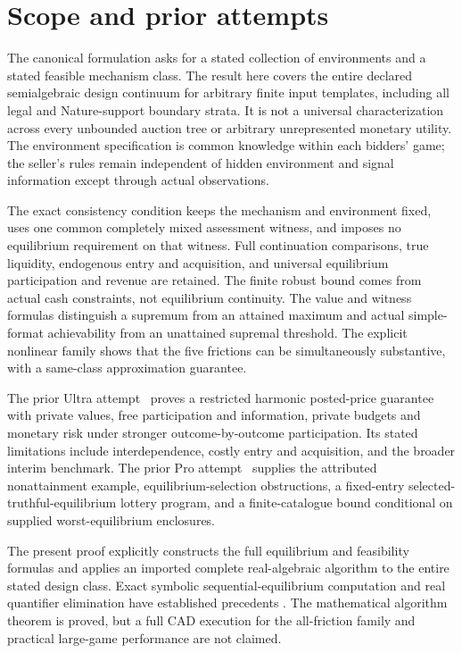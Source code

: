 \documentclass[11pt,a4paper]{article}
\numberwithin{equation}{section}
\theoremstyle{definition}
\begin{document}
\section{Scope and prior attempts}\label{sec:scope}
The canonical formulation asks for a stated collection of environments
and a stated feasible mechanism class.
The result here covers the entire declared semialgebraic design
continuum for arbitrary finite input templates, including all legal
and Nature-support boundary strata.
It is not a universal characterization across every unbounded
auction tree or arbitrary unrepresented monetary utility.
The environment specification is common knowledge within each
bidders' game; the seller's rules remain independent of hidden
environment and signal information except through actual observations.

The exact consistency condition keeps the mechanism and environment
fixed, uses one common completely mixed assessment witness, and imposes
no equilibrium requirement on that witness.
Full continuation comparisons, true liquidity, endogenous entry and
acquisition, and universal equilibrium participation and revenue are
retained. The finite robust bound comes from actual cash constraints,
not equilibrium continuity.
The value and witness formulas distinguish a supremum from an attained
maximum and actual simple-format achievability from an unattained
supremal threshold.
The explicit nonlinear family shows that the five frictions can be
simultaneously substantive, with a same-class approximation guarantee.

The prior Ultra attempt~\cite{PriorUltra} proves a restricted
harmonic posted-price guarantee with private values, free participation
and information, private budgets and monetary risk under stronger
outcome-by-outcome participation.
Its stated limitations include interdependence, costly entry and
acquisition, and the broader interim benchmark.
The prior Pro attempt~\cite{PriorPro} supplies the attributed
nonattainment example, equilibrium-selection obstructions, a
fixed-entry selected-truthful-equilibrium lottery program, and a
finite-catalogue bound conditional on supplied worst-equilibrium
enclosures.

The present proof explicitly constructs the full equilibrium and
feasibility formulas and applies an imported complete real-algebraic
algorithm to the entire stated design class.
Exact symbolic sequential-equilibrium computation and real quantifier
elimination have established precedents
\cite{KW1982,GEN2024,Basu2014}.
The mathematical algorithm theorem is proved, but a full CAD execution
for the all-friction family and practical large-game performance
are not claimed.
\end{document}
